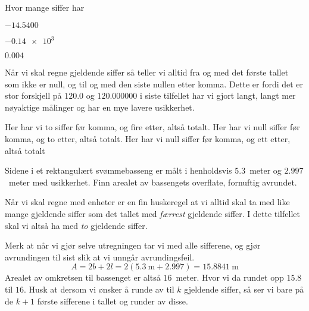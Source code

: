 \documentclass[a4paper,11pt]{article}
\begin{document}
\begin{problem}
  Hvor mange siffer har
  \begin{subproblem}{3}
    \item $\num{-14.5400}$ 
      \label{subproblem:1.3-3a-MAT-0001-2019-V}
    \item $\num{-0.14e3}$ 
      \label{subproblem:1.3-3b-MAT-0001-2019-V}
    \item $\num{0.004}$ 
      \label{subproblem:1.3-3c-MAT-0001-2019-V}
  \end{subproblem}
\end{problem}

\begin{solution}
  Når vi skal regne gjeldende siffer så teller vi alltid fra og med det første
  tallet som ikke er null, og til og med den siste nullen etter komma. Dette er
  fordi det er stor forskjell på $\num{120,0}$ og $\num{120,000000}$ i siste
  tilfellet har vi gjort langt, langt mer nøyaktige målinger og har en mye
  lavere usikkerhet. \medskip

   Her har vi to siffer før
  komma, og fire etter, altså  totalt.
   Her har vi null siffer før
  komma, og to etter, altså  totalt.
   Her har vi null siffer før
  komma, og ett etter, altså  totalt
\end{solution}


\begin{problem}
  Sidene i et rektangulært svømmebasseng er målt i henholdsvis $\num{5.3}$~meter
  og $\num{2.997}$~meter med usikkerhet. Finn arealet av bassengets overflate,
  fornuftig avrundet. 
\end{problem}

\begin{solution}
  Når vi skal regne med enheter er en fin huskeregel at vi alltid skal ta med
  like mange gjeldende siffer som det tallet med \emph{færrest} gjeldende
  siffer. I dette tilfellet skal vi altså ha med \emph{to} gjeldende siffer.

  Merk at når vi gjør selve utregningen tar vi med alle sifferene, og gjør
  avrundingen til sist slik at vi unngår avrundingsfeil.
  \begin{equation*}
    A = 2b + 2l = 2(\SI{5.3}{\m} + \SI{2.997}) = \SI{15.8841}{\m}
  \end{equation*}
  Arealet av omkretsen til bassenget er altså $\num{16}$~meter. Hvor
  vi da rundet opp $\num{15.8}$ til $\num{16}$. Husk at dersom vi ønsker å runde
  av til $k$ gjeldende siffer, så ser vi bare på de $k+1$ første sifferene i
  tallet og runder av disse.
\end{solution}
\end{document}

